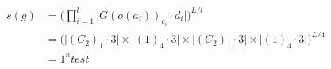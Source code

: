 \documentclass[preview]{standalone}
\begin{document}
\begin{align*}
s(g) &= \big(\prod_{i=1}^{l}\big|G(o(a_i))_{c_i}\cdot d_i\big|\big)^{L/l} \\   &= \big(\big|(C_2)_1\cdot 3\big| \times \big|(1)_4\cdot 3\big|\times \big|(C_2)_1\cdot 3\big| \times \big|(1)_4\cdot 3\big|)^{L/4} \\   &= 1^{n}test
\end{align*}
\end{document}
